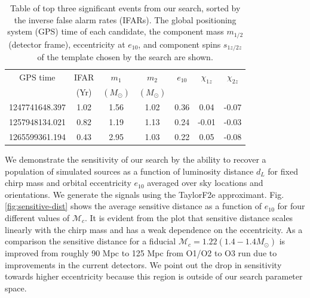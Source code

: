 \begin{table}[H]
    \centering
    \begin{tabular}{ccccccc}
        \hline
        \hline
         GPS time &  IFAR & $m_1$ & $m_2$ & $e_{10}$ & $\chi_{1z}$ & $\chi_{2z}$\\
         & (Yr)& $(M_{\odot})$ & $(M_{\odot})$ & & & \\
         \hline
         1247741648.397 & 1.02 & 1.56 & 1.02 & 0.36 & 0.04 & -0.07 \\
         1257948134.021 & 0.82 & 1.19 & 1.13 & 0.24 & -0.01 & -0.03 \\
         1265599361.194 & 0.43 & 2.95 & 1.03 & 0.22 & 0.05 & -0.08 \\
        \hline
    \end{tabular}
    \caption{Table of top three significant events from our search, sorted by the inverse false alarm rates (IFARs). The global positioning system (GPS) time of each candidate, the component mass $m_{1/2}$ (detector frame), eccentricity at $e_{10}$, and component spins $s_{1z/2z}$ of the template chosen by the search are shown.}
    \label{tab:significant-events}
\end{table}

We demonstrate the sensitivity of our search by the ability to recover a population of simulated sources as a function of luminosity distance $d_L$ for fixed chirp mass and orbital eccentricity $e_{10}$ averaged over sky locations and orientations. We generate the signals using the TaylorF2e approximant. Fig. \ref{fig:sensitive-dist} shows the average sensitive distance as a function of $e_{10}$ for four different values of $\mathcal{M}_c$. It is evident from the plot that sensitive distance scales linearly with the chirp mass and has a weak dependence on the eccentricity. As a comparison the sensitive distance for a fiducial $\mathcal{M}_c = 1.22 (1.4-1.4 M_{\odot})$ is improved from roughly 90 Mpc to 125 Mpc from O1/O2 to O3 run due to improvements in the current detectors. We point out the drop in sensitivity towards higher eccentricity because this region is outside of our search parameter space. 


